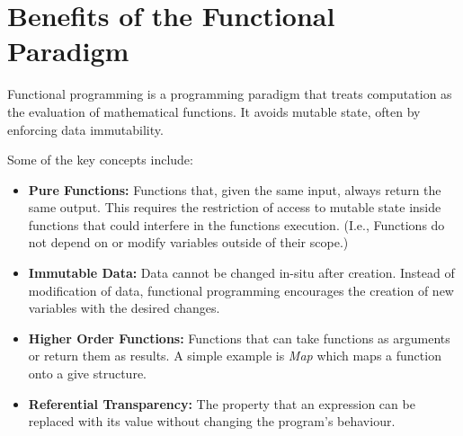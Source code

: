 \documentclass{l4proj}
\begin{document}





\section{Benefits of the Functional Paradigm}

Functional programming is a programming paradigm that treats computation as the evaluation of mathematical functions.
It avoids mutable state, often by enforcing data immutability.

Some of the key concepts include:

\begin{itemize}
    \item \textbf{Pure Functions:} Functions that, given the same input, always return the same output.
    This requires the restriction of access to mutable state inside functions that could interfere in the functions execution.
    (I.e., Functions do not depend on or modify variables outside of their scope.)
    \item \textbf{Immutable Data:} Data cannot be changed in-situ after creation.
    Instead of modification of data, functional programming encourages the creation of new variables with the desired changes.
    \item \textbf{Higher Order Functions:} Functions that can take functions as arguments or return them as results.
    A simple example is \emph{Map} which maps a function onto a give structure.
    \item \textbf{Referential Transparency:} The property that an expression can be replaced with its value without changing the program's behaviour. 
\end{itemize}
\end{document}
